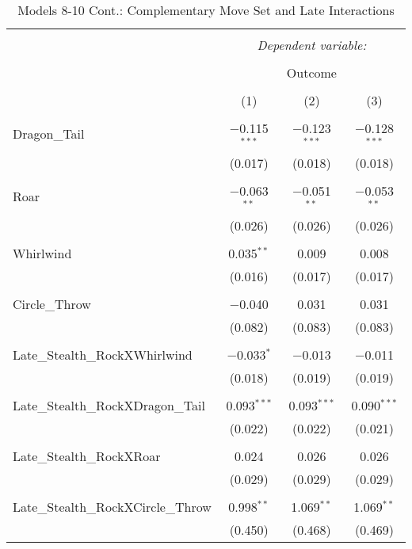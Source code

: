 \documentclass[12pt,twoside]{reedthesis}
\begin{document}
  \begin{table}[!htbp] \centering 
    \caption{Models 8-10 Cont.: Complementary Move Set and Late Interactions} 
    \label{} 
  \begin{tabular}{@{\extracolsep{5pt}}lccc} 
  \\[-1.8ex]\hline 
  \hline \\[-1.8ex] 
   & \multicolumn{3}{c}{\textit{Dependent variable:}} \\ 
  \cline{2-4} 
  \\[-1.8ex] & \multicolumn{3}{c}{Outcome} \\ 
  \\[-1.8ex] & (1) & (2) & (3)\\ 
  \hline \\[-1.8ex] 
   Dragon\_Tail & $-$0.115$^{***}$ & $-$0.123$^{***}$ & $-$0.128$^{***}$ \\ 
    & (0.017) & (0.018) & (0.018) \\ 
    & & & \\ 
   Roar & $-$0.063$^{**}$ & $-$0.051$^{**}$ & $-$0.053$^{**}$ \\ 
    & (0.026) & (0.026) & (0.026) \\ 
    & & & \\ 
   Whirlwind & 0.035$^{**}$ & 0.009 & 0.008 \\ 
    & (0.016) & (0.017) & (0.017) \\ 
    & & & \\ 
   Circle\_Throw & $-$0.040 & 0.031 & 0.031 \\ 
    & (0.082) & (0.083) & (0.083) \\ 
    & & & \\ 
   Late\_Stealth\_RockXWhirlwind & $-$0.033$^{*}$ & $-$0.013 & $-$0.011 \\ 
    & (0.018) & (0.019) & (0.019) \\ 
    & & & \\ 
   Late\_Stealth\_RockXDragon\_Tail & 0.093$^{***}$ & 0.093$^{***}$ & 0.090$^{***}$ \\ 
    & (0.022) & (0.022) & (0.021) \\ 
    & & & \\ 
   Late\_Stealth\_RockXRoar & 0.024 & 0.026 & 0.026 \\ 
    & (0.029) & (0.029) & (0.029) \\ 
    & & & \\ 
   Late\_Stealth\_RockXCircle\_Throw & 0.998$^{**}$ & 1.069$^{**}$ & 1.069$^{**}$ \\ 
    & (0.450) & (0.468) & (0.469) \\ 

\end{tabular}
\end{table}
\end{document}
